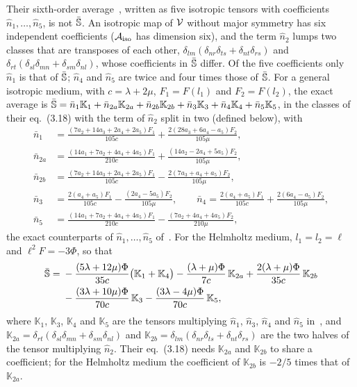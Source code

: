 Their sixth-order average~\cite[eq.~(3.18)]{Ma2018}, written as five isotropic tensors with
coefficients $\hat n_1,\dots,\hat n_5$, is not $\bar{\mathbb{S}}$. An isotropic map of $\mathcal{V}$ without major
symmetry has six independent coefficients ($\mathcal{A}_{\mathrm{iso}}$ has dimension six), and the term
$\hat n_2$ lumps two classes that are transposes of each other,
$\delta_{lm}(\delta_{nr}\delta_{ts}+\delta_{nt}\delta_{rs})$ and
$\delta_{rt}(\delta_{sl}\delta_{mn}+\delta_{sm}\delta_{nl})$, whose coefficients in $\bar{\mathbb{S}}$
differ. Of the five coefficients only $\hat n_1$ is that of $\bar{\mathbb{S}}$; $\hat n_4$ and $\hat n_5$
are twice and four times those of $\bar{\mathbb{S}}$. For a general isotropic medium, with $c=\lambda+2\mu$, $F_1=F(l_1)$ and
$F_2=F(l_2)$, the exact average is
$\bar{\mathbb{S}}=\bar n_1\mathbb K_1+\bar n_{2a}\mathbb K_{2a}+\bar n_{2b}\mathbb K_{2b}+\bar n_3\mathbb K_3
+\bar n_4\mathbb K_4+\bar n_5\mathbb K_5$, in the classes of their eq.~(3.18) with the term of $\hat n_2$ split in two (defined below), with
\begin{equation}
\begin{aligned}
\bar n_1&=\frac{(7a_2+14a_3+2a_4+2a_5)F_1}{105c}+\frac{2(28a_3+6a_4-a_5)F_2}{105\mu},\\
\bar n_{2a}&=\frac{(14a_1+7a_2+4a_4+4a_5)F_1}{210c}+\frac{(14a_2-2a_4+5a_5)F_2}{105\mu},\\
\bar n_{2b}&=\frac{(7a_2+14a_3+2a_4+2a_5)F_1}{105c}-\frac{2(7a_3+a_4+a_5)F_2}{105\mu},\\
\bar n_3&=\frac{2(a_4+a_5)F_1}{105c}-\frac{(2a_4-5a_5)F_2}{105\mu},\qquad
\bar n_4=\frac{2(a_4+a_5)F_1}{105c}+\frac{2(6a_4-a_5)F_2}{105\mu},\\
\bar n_5&=\frac{(14a_1+7a_2+4a_4+4a_5)F_1}{210c}-\frac{(7a_2+4a_4+4a_5)F_2}{210\mu},
\end{aligned}\label{eq:esh-six-general}
\end{equation}
the exact counterparts of $\hat n_1,\dots,\hat n_5$ of~\cite[eq.~(3.18)]{Ma2018}. For the
Helmholtz medium, $l_1=l_2=\ell$ and $\ell^2F=-3\Phi$, so that
\begin{equation}
\begin{aligned}
\bar{\mathbb{S}}={}&-\frac{(5\lambda+12\mu)\Phi}{35c}\big(\mathbb K_1+\mathbb K_4\big)
-\frac{(\lambda+\mu)\Phi}{7c}\,\mathbb K_{2a}+\frac{2(\lambda+\mu)\Phi}{35c}\,\mathbb K_{2b}\\
&-\frac{(3\lambda+10\mu)\Phi}{70c}\,\mathbb K_3-\frac{(3\lambda-4\mu)\Phi}{70c}\,\mathbb K_5,
\end{aligned}
\end{equation}
where $\mathbb K_1$, $\mathbb K_3$, $\mathbb K_4$ and $\mathbb K_5$ are the tensors multiplying
$\hat n_1$, $\hat n_3$, $\hat n_4$ and $\hat n_5$ in~\cite[eq.~(3.18)]{Ma2018}, and
$\mathbb K_{2a}=\delta_{rt}(\delta_{sl}\delta_{mn}+\delta_{sm}\delta_{nl})$ and
$\mathbb K_{2b}=\delta_{lm}(\delta_{nr}\delta_{ts}+\delta_{nt}\delta_{rs})$ are the two halves
of the tensor multiplying $\hat n_2$. Their eq.~(3.18) needs $\mathbb K_{2a}$ and $\mathbb K_{2b}$
to share a coefficient; for the Helmholtz medium the coefficient of $\mathbb K_{2b}$ is $-2/5$
times that of $\mathbb K_{2a}$.

